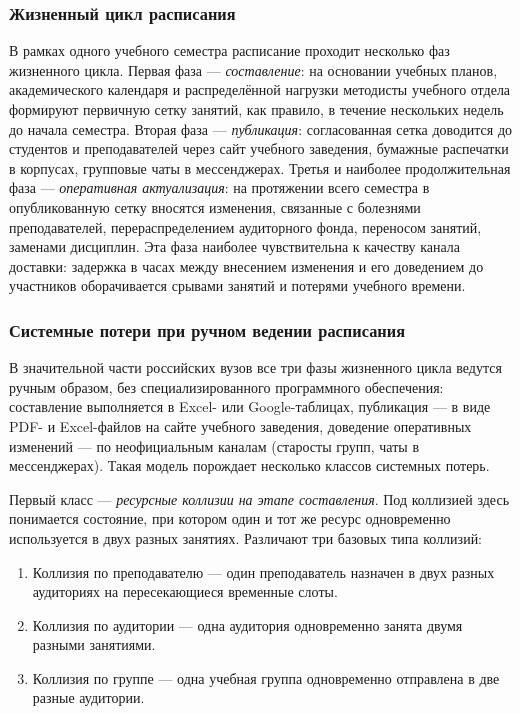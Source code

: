 \subsubsection{Жизненный цикл расписания}

В рамках одного учебного семестра расписание проходит несколько фаз жизненного цикла. Первая фаза --- \emph{составление}: на основании учебных планов, академического календаря и распределённой нагрузки методисты учебного отдела формируют первичную сетку занятий, как правило, в течение нескольких недель до начала семестра. Вторая фаза --- \emph{публикация}: согласованная сетка доводится до студентов и преподавателей через сайт учебного заведения, бумажные распечатки в корпусах, групповые чаты в мессенджерах. Третья и наиболее продолжительная фаза --- \emph{оперативная актуализация}: на протяжении всего семестра в опубликованную сетку вносятся изменения, связанные с болезнями преподавателей, перераспределением аудиторного фонда, переносом занятий, заменами дисциплин. Эта фаза наиболее чувствительна к качеству канала доставки: задержка в часах между внесением изменения и его доведением до участников оборачивается срывами занятий и потерями учебного времени.

\subsubsection{Системные потери при ручном ведении расписания}

В значительной части российских вузов все три фазы жизненного цикла ведутся ручным образом, без специализированного программного обеспечения: составление выполняется в Excel- или Google-таблицах, публикация --- в виде PDF- и Excel-файлов на сайте учебного заведения, доведение оперативных изменений --- по неофициальным каналам (старосты групп, чаты в мессенджерах). Такая модель порождает несколько классов системных потерь.

Первый класс --- \emph{ресурсные коллизии на этапе составления}. Под коллизией здесь понимается состояние, при котором один и тот же ресурс одновременно используется в двух разных занятиях. Различают три базовых типа коллизий:

\begin{enumerate}
  \item Коллизия по преподавателю --- один преподаватель назначен в двух разных аудиториях на пересекающиеся временные слоты.
  \item Коллизия по аудитории --- одна аудитория одновременно занята двумя разными занятиями.
  \item Коллизия по группе --- одна учебная группа одновременно отправлена в две разные аудитории.
\end{enumerate}

